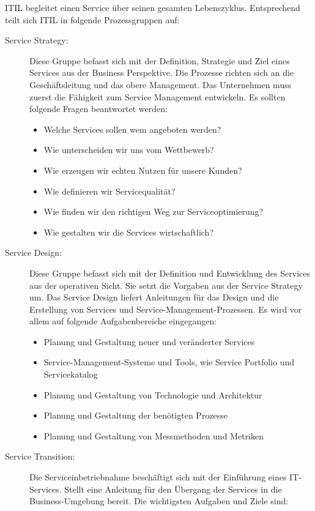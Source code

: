 ITIL begleitet einen Service über seinen gesamten Lebenszyklus. Entsprechend teilt sich ITIL in folgende Prozessgruppen auf:
\begin{description}
	\item[Service Strategy:] Diese Gruppe befasst sich mit der Definition, Strategie und Ziel eines Services aus der Business Perspektive. Die Prozesse richten sich an die Geschäftsleitung und das obere Management. Das Unternehmen muss zuerst die Fähigkeit zum Service Management entwickeln. Es sollten folgende Fragen beantwortet werden:
	\begin{itemize}
		\item Welche Services sollen wem angeboten werden?
		\item Wie unterscheiden wir uns vom Wettbewerb?
		\item Wie erzeugen wir echten Nutzen für unsere Kunden?
		\item Wie definieren wir Servicequalität?
		\item Wie finden wir den richtigen Weg zur Serviceoptimierung?
		\item Wie gestalten wir die Services wirtschaftlich?
	\end{itemize}
	\item[Service Design:] Diese Gruppe befasst sich mit der Definition und Entwicklung des Services aus der operativen Sicht. Sie setzt die Vorgaben aus der Service Strategy um. Das Service Design liefert Anleitungen für das Design und die
	Erstellung von Services und Service-Management-Prozessen. Es wird vor allem auf folgende Aufgabenbereiche eingegangen:
	\begin{itemize}
		\item Planung und Gestaltung neuer und veränderter Services
		\item Service-Management-Systeme und Tools, wie Service Portfolio und Servicekatalog
		\item Planung und Gestaltung von Technologie und Architektur
		\item Planung und Gestaltung der benötigten Prozesse
		\item Planung und Gestaltung von Messmethoden und Metriken
	\end{itemize}
	\item[Service Transition:] Die Serviceinbetriebnahme beschäftigt sich mit der Einführung eines IT-Services. Stellt eine Anleitung für den Übergang der Services in die Business-Umgebung bereit. Die wichtigsten Aufgaben und Ziele sind:
	\begin{itemize}

\end{itemize}
\end{description}
